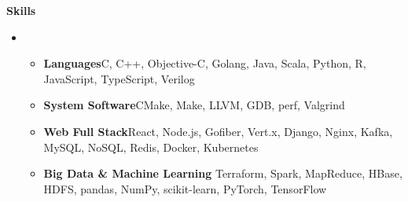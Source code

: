 \documentclass[letterpaper,10pt]{article}[leftmargin=*]
\def \entryspacing {-0pt}
\renewcommand{\section}[2]{
  \vspace{4pt}
  {
    \color{secondary}\large\textbf{{#1}{\hspace{4pt}#2}}
    \hrulefill
  }
  \vspace{-2pt}
}
\newcommand{\resumeEntryStart}{\begin{itemize}[leftmargin=0mm]}
\newcommand{\resumeEntryEnd}{\end{itemize}\vspace{\entryspacing}}
\newcommand{\resumeItemListStart}{\begin{itemize}[leftmargin=6mm,before=\setlength{\rightmargin}{3pt}]}
\newcommand{\resumeItemListEnd}{\end{itemize}}
\newcommand{\resumeItem}[1]{
  \item\small{
    {#1 \vspace{-1pt}}
  }
}
\begin{document}
\section{\faMagic}{Skills}

 \vspace{-3pt}

 \resumeEntryStart
  \item[]
  \resumeItemListStart
    \resumeItem
      {\textbf{Languages}\hspace{79.2pt}C, C++, Objective-C, Golang, Java, Scala, Python, R, JavaScript, TypeScript, Verilog}
    \resumeItem
      {\textbf{System Software}\hspace{54pt}CMake, Make, LLVM, GDB, perf, Valgrind}
    \resumeItem
      {\textbf{Web Full Stack}\hspace{64.1pt}React, Node.js, Gofiber, Vert.x, Django, Nginx, Kafka, MySQL, NoSQL, Redis, Docker, Kubernetes}
    \resumeItem
      {\textbf{Big Data \& Machine Learning} \hspace{3.9pt}Terraform, Spark, MapReduce, HBase, HDFS, pandas, NumPy, scikit-learn, PyTorch, TensorFlow}
    \resumeItemListEnd
 \resumeEntryEnd
\end{document}
